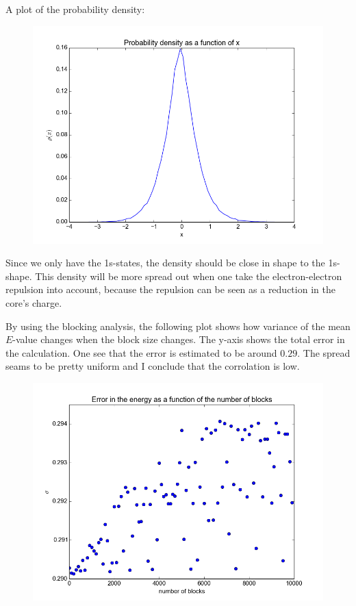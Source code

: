 \documentclass[a4paper, 12pt, titlepage]{article}
\begin{document}
 A plot of the probability density:
 \begin{figure}[H] 
 	\centering
 	\includegraphics[width=\textwidth]{../python_programs/ProbabilityDensity.png}
 \end{figure}
 Since we only have the 1s-states, the density should be close in shape to the 1s-shape. This density will be more spread out when one take the electron-electron repulsion into account, because the repulsion can be seen as a reduction in the core's charge. 

 By using the blocking analysis, the following plot shows how variance of the mean $E$-value changes when the block size changes. The y-axis shows the total error in the calculation. 
 One see that the error is estimated to be around $0.29$. The spread seams to be pretty uniform and I conclude that the corrolation is low. 
 \begin{figure}[H] 
 	\centering
 	\includegraphics[width=\textwidth]{../python_programs/HeliumBlocking.png}
 \end{figure}
\end{document}
